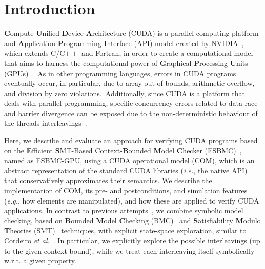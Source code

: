 \documentclass[times, doublespace]{cpeauth}
\begin{document}
\vspace{-6pt}
\section{Introduction}
\vspace{-2pt}

{\bf C}ompute {\bf U}nified {\bf D}evice {\bf A}rchitecture (CUDA) is a parallel computing platform and {\bf A}pplication {\bf P}rogramming {\bf I}nterface (API) model created by NVIDIA~\cite{cuda:2012}, which extends C/C$++$ and Fortran, in order to create a computational model that aims to harness the computational power of {\bf G}raphical {\bf P}rocessing {\bf U}nits (GPUs)~\cite{gpu:2010}.\ As in other programming languages, errors in CUDA programs eventually occur, in particular, due to array out-of-bounds, arithmetic overflow, and division by zero violations.\ Additionally, since CUDA is a platform that deals with parallel programming, specific concurrency errors related to data race and barrier divergence can be exposed due to the non-deterministic behaviour of the threads interleavings~\cite{betts:2012}.

Here, we describe and evaluate an approach for verifying CUDA programs based on the {\bf E}fficient {\bf S}MT-Based Context-{\bf B}ounded {\bf M}odel {\bf C}hecker (ESBMC)~\cite{cordeiro:2011,cordeiro:2012,ramalho:2013}, named as ESBMC-GPU, using a CUDA operational model (COM), which is an abstract representation of the standard CUDA libraries ({\it i.e.}, the native API) that conservatively approximates their semantics. We describe the implementation of COM, its pre- and postconditions, and simulation features ({\it e.g.}, how elements are manipulated), and how these are applied to verify CUDA applications. In contrast to previous attempts~\cite{betts:2012,Li:2010,Li:2012,civl:2015}, we combine symbolic model checking, based on {\bf B}ounded {\bf M}odel {\bf C}hecking (BMC)~\cite{Biere:2009} and {\bf S}atisfiability {\bf M}odulo {\bf T}heories (SMT)~\cite{Barrett:2009} techniques, with explicit state-space exploration, similar to Cordeiro {\it et al.}~\cite{cordeiro:2011}. In particular, we explicitly explore the possible interleavings (up to the given context bound), while we treat each interleaving itself symbolically w.r.t. a given property.
\end{document}
